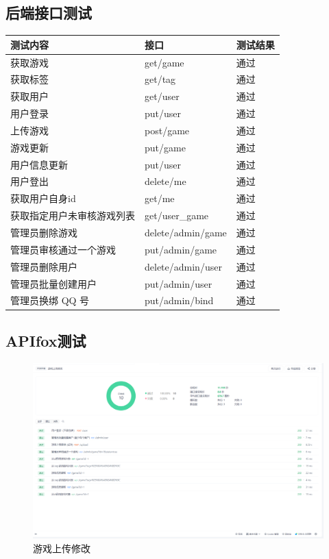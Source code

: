 \documentclass[12pt]{ctexart} %
\begin{document}
\subsection{后端接口测试}
\begin{table}[H]
\centering
\renewcommand{\arraystretch}{1.5} 
\large
\begin{tabular}{|>{\centering\arraybackslash}m{8cm}|>{\centering\arraybackslash}m{5cm}|>{\centering\arraybackslash}m{3cm}|}
\hline
\textbf{测试内容} & \textbf{接口} & \textbf{测试结果}\\
\hline
获取游戏 & get/game & 通过\\
\hline
获取标签 & get/tag & 通过\\
\hline
获取用户 & get/user & 通过\\
\hline
用户登录 & put/user & 通过\\
\hline
上传游戏 & post/game & 通过\\
\hline
游戏更新 & put/game & 通过\\
\hline
用户信息更新 & put/user & 通过\\
\hline
用户登出 & delete/me & 通过\\
\hline
获取用户自身id & get/me & 通过\\
\hline
获取指定用户未审核游戏列表 & get/user\_game & 通过\\
\hline
管理员删除游戏 & delete/admin/game & 通过\\
\hline
管理员审核通过一个游戏 & put/admin/game & 通过\\
\hline
管理员删除用户 & delete/admin/user & 通过\\
\hline
管理员批量创建用户 & put/admin/user & 通过\\
\hline
管理员换绑 QQ 号 & put/admin/bind & 通过\\
\hline
\end{tabular}
\end{table}

\subsection{APIfox测试}
\begin{figure}[H]
  \centering
  \includegraphics[width=\textwidth]{testresult1.png}
  \caption{游戏上传修改}
\end{figure}
\end{document}
